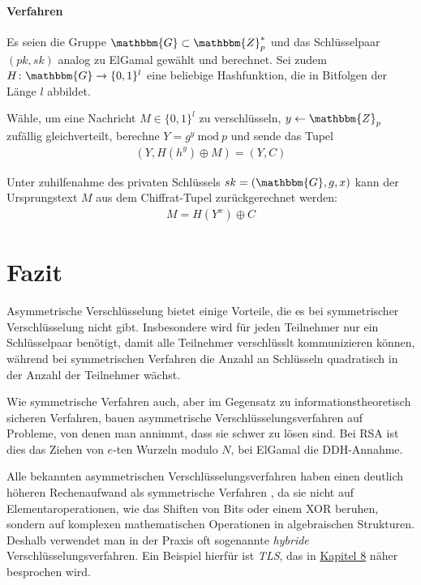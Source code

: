 \paragraph*{Verfahren} Es seien die Gruppe $\mathbbm{G} \subset
\mathbbm{Z}^*_p$ und das Schlüsselpaar $(pk,sk)$ analog zu ElGamal
gewählt und berechnet. Sei zudem $H \colon \mathbbm{G} \rightarrow
\{0,1\}^l$ eine beliebige Hashfunktion, die in Bitfolgen der Länge $l$
abbildet.

Wähle, um eine Nachricht $M \in \{0,1\}^l$ zu verschlüsseln, $y
\leftarrow \mathbbm{Z}_p$ zufällig gleichverteilt, berechne $Y = g^y\
\text{mod}\ p$ und sende das Tupel
\begin{align*} (Y, H(h^y) \oplus M) = (Y, C)
\end{align*}

Unter zuhilfenahme des privaten Schlüssels $sk = (\mathbbm{G}, g, x)$
kann der Ursprungstext $M$ aus dem Chiffrat-Tupel zurückgerechnet
werden:
\begin{align*} M = H(Y^x) \oplus C
\end{align*}

\section{Fazit} Asymmetrische Verschlüsselung \indexEncryptionAsymm
bietet einige Vorteile, die es bei symmetrischer Verschlüsselung nicht
gibt. Insbesondere wird für jeden Teilnehmer nur ein Schlüsselpaar
benötigt, damit alle Teilnehmer verschlüsslt kommunizieren können,
während bei symmetrischen Verfahren die Anzahl an Schlüsseln quadratisch
in der Anzahl der Teilnehmer wächst.

Wie symmetrische Verfahren auch, aber im Gegensatz zu
informationstheoretisch sicheren Verfahren, bauen asymmetrische
Verschlüsselungsverfahren auf Probleme, von denen man annimmt, dass sie
schwer zu lösen sind. Bei RSA ist dies das Ziehen von $e$-ten Wurzeln
modulo $N$, bei ElGamal die DDH-Annahme.

Alle bekannten asymmetrischen Verschlüsselungsverfahren haben einen
deutlich höheren Rechenaufwand als symmetrische Verfahren
\indexEncryptionSymm, da sie nicht auf Elementaroperationen, wie das
Shiften von Bits oder einem XOR beruhen, sondern auf komplexen
mathematischen Operationen in algebraischen Strukturen. Deshalb
verwendet man in der Praxis oft sogenannte \emph{hybride}
Verschlüsselungsverfahren\indexEncryptionHybrid. Ein Beispiel hierfür
ist \emph{TLS}\indexTLS, das in \hyperref[cha:keyexchange]{Kapitel 8}
näher besprochen wird.